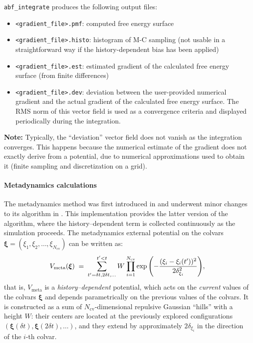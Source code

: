 \bigskip
\texttt{abf\_integrate} produces the following output files:
\begin{itemize}
\setlength{\itemsep}{0pt}
\item \texttt{<gradient\_file>.pmf}: computed free energy surface
\item \texttt{<gradient\_file>.histo}: histogram of M-C sampling (not
usable in a straightforward way if the history-dependent bias has been applied)
\item \texttt{<gradient\_file>.est}: estimated gradient of the calculated free energy surface
(from finite differences)
\item \texttt{<gradient\_file>.dev}: deviation between the user-provided numerical gradient
and the actual gradient of the calculated free energy surface. The RMS norm of this vector
field is used as a convergence criteria and displayed periodically during the integration.
\end{itemize}

\textbf{Note:} Typically, the ``deviation'' vector field does not vanish as the integration
converges. This happens because the numerical estimate of the gradient does not exactly derive from a
potential, due to numerical approximations used to obtain it (finite sampling and
discretization on a grid).



\paragraph*{Metadynamics calculations}
\label{sec:colvarbias_meta}

The metadynamics method was first introduced in \cite{Laio2002} and
underwent minor changes to its algorithm in \cite{Iannuzzi2003}.
This implementation provides the latter version of the algorithm,
where the history--dependent term is collected continuously as the
simulation proceeds.  The metadynamics external potential on the
colvars $\bm{\xi} = (\xi_{1}, \xi_{2}, \ldots,
\xi_{N_{\mathrm{cv}}})$ can be written as:
\begin{equation}
  \label{eq:colvars_meta_pot}
  V_{\mathrm{meta}}({\mbox{\boldmath{$\xi$}}}) \; = \; {
    \sum_{t' = \delta{}t, \\ 2\delta{}t, \\ \ldots}^{t'<t} W \: {
      \prod_{i = 1}^{N_{\mathrm{cv}}}
      \exp\left(-\frac{(\xi_{i}-\xi_{i}(t'))^{2}}{2\delta_{\xi_{i}}^{2}}\right)
    }
  }\mathrm{,}
\end{equation}
that is, $V_{\mathrm{meta}}$ is a \emph{history--dependent} potential,
which acts on the \emph{current} values of the colvars $\bm{\xi}$ and
depends parametrically on the previous values of the colvars.  It is
constructed as a sum of $N_{\mathrm{cv}}$-dimensional repulsive
Gaussian ``hills'' with a height $W$: their centers are located at the
previously explored configurations $\left(\bm{\xi}(\delta{}t),
  \bm{\xi}(2\delta{}t), \ldots\right)$, and they extend by
approximately $2\delta_{\xi_{i}}$ in the direction of the $i$-th
colvar.

